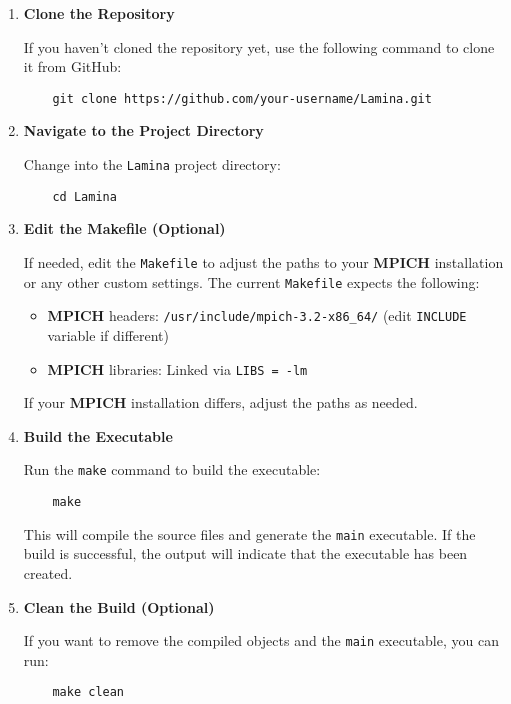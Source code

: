 \documentclass[a4paper,10pt]{article}
\begin{document}
\begin{enumerate}
    \item \textbf{Clone the Repository}
    
    If you haven't cloned the repository yet, use the following command to clone it from GitHub:
    
    \begin{verbatim}
    git clone https://github.com/your-username/Lamina.git
    \end{verbatim}
    
    \item \textbf{Navigate to the Project Directory}
    
    Change into the \texttt{Lamina} project directory:
    
    \begin{verbatim}
    cd Lamina
    \end{verbatim}
    
    \item \textbf{Edit the Makefile (Optional)}
    
    If needed, edit the \texttt{Makefile} to adjust the paths to your \textbf{MPICH} installation or any other custom settings. The current \texttt{Makefile} expects the following:
    
    \begin{itemize}
        \item \textbf{MPICH} headers: \texttt{/usr/include/mpich-3.2-x86\_64/} (edit \texttt{INCLUDE} variable if different)
        \item \textbf{MPICH} libraries: Linked via \texttt{LIBS = -lm}
    \end{itemize}
    
    If your \textbf{MPICH} installation differs, adjust the paths as needed.
    
    \item \textbf{Build the Executable}
    
    Run the \texttt{make} command to build the executable:
    
    \begin{verbatim}
    make
    \end{verbatim}
    
    This will compile the source files and generate the \texttt{main} executable. If the build is successful, the output will indicate that the executable has been created.
    
    \item \textbf{Clean the Build (Optional)}
    
    If you want to remove the compiled objects and the \texttt{main} executable, you can run:
    
    \begin{verbatim}
    make clean
    \end{verbatim}
\end{enumerate}
\end{document}
